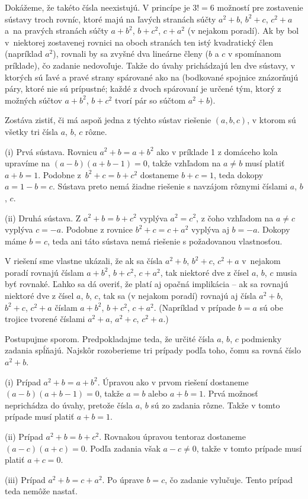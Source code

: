 {%
Dokážeme, že takéto čísla neexistujú.
V princípe je $3!=6$ možností pre zostavenie sústavy troch rovníc, ktoré majú na ľavých stranách súčty $a^2 + b$, $b^2 + c$, $c^2 +a $ a~na pravých stranách súčty $a+b^2$, $b+c^2$, $c+a^2$ (v nejakom poradí). Ak by bol v~niektorej zostavenej rovnici na oboch stranách ten istý kvadratický člen (napríklad $a^2$), rovnali by sa zvyšné dva lineárne členy ($b$ a $c$ v spomínanom príklade), čo zadanie nedovoľuje.
Takže do úvahy prichádzajú len dve sústavy, v ktorých sú ľavé a pravé strany spárované ako na \obr{} (bodkované spojnice znázorňujú páry, ktoré nie sú prípustné; každé z dvoch spárovaní je určené tým, ktorý z možných súčtov $a+b^2$, $b+c^2$ tvorí pár so súčtom $a^2+b$).
%

Zostáva zistiť, či má aspoň jedna z týchto sústav riešenie $(a,b,c)$, v ktorom sú všetky tri čísla $a$, $b$, $c$ rôzne.

\smallskip
\item{(i)} Prvá sústava. Rovnicu $a^2+b=a+b^2$ ako v príklade 1 z domáceho kola upravíme na $(a-b)(a+b-1)=0$, takže vzhľadom na $a\ne b$ musí platiť $a+b=1$. Podobne z~$b^2+c=b+c^2$ dostaneme $b+c=1$, teda dokopy $a=1-b=c$. Sústava preto nemá žiadne riešenie s navzájom rôznymi číslami $a$, $b$, $c$.
\item{(ii)} Druhá sústava. Z $a^2+b=b+c^2$
 vyplýva $a^2=c^2$, z čoho vzhľadom na $a\ne c$ vyplýva $c={-a}$. Podobne z rovnice $b^2+c=c+a^2$ vyplýva aj $b={-a}$. Dokopy máme $b=c$,
 teda ani táto sústava nemá riešenie s požadovanou vlastnosťou.


\poznamka
V riešení sme vlastne ukázali, že ak sa čísla $a^2 + b$, $b^2 +c$, $c^2 +a$ v~nejakom poradí rovnajú číslam $a+b^2$, $b+c^2$, $c+a^2$, tak niektoré dve z čísel $a$, $b$, $c$ musia byť rovnaké.
Ľahko sa dá overiť, že platí aj opačná implikácia -- ak sa rovnajú niektoré dve z čísel $a$, $b$, $c$, tak sa (v nejakom poradí) rovnajú aj čísla $a^2+b$, $b^2+c$, $c^2+a$ číslam $a+b^2$, $b+c^2$, $c+a^2$. (Napríklad v prípade $b=a$ sú obe trojice tvorené číslami $a^2+a$, $a^2+c$, $c^2+a$.)


\ineriesenie
Postupujme sporom. Predpokladajme teda, že určité čísla $a$, $b$, $c$ podmienky zadania spĺňajú.
Najskôr rozoberieme tri prípady podľa toho, čomu sa rovná číslo $a^2+b$.

\smallskip
\item{(i)} Prípad $a^2+b=a+b^2$. Úpravou ako v prvom riešení dostaneme $(a-b)(a+b-1)=0$, takže $a=b$ alebo $a+b=1$. Prvá možnosť neprichádza do úvahy, pretože čísla $a$, $b$ sú zo zadania rôzne. Takže v tomto prípade musí platiť $a+b=1$.
\item{(ii)} Prípad $a^2+b=b+c^2$. Rovnakou úpravou tentoraz dostaneme $(a-c)(a+c)=0$. Podľa zadania však
$a-c\ne0$, takže v tomto prípade musí platiť $a+c=0$.
\item{(iii)} Prípad $a^2+b=c+a^2$. Po úprave $b=c$, čo zadanie vylučuje. Tento prípad teda nemôže nastať.

}
